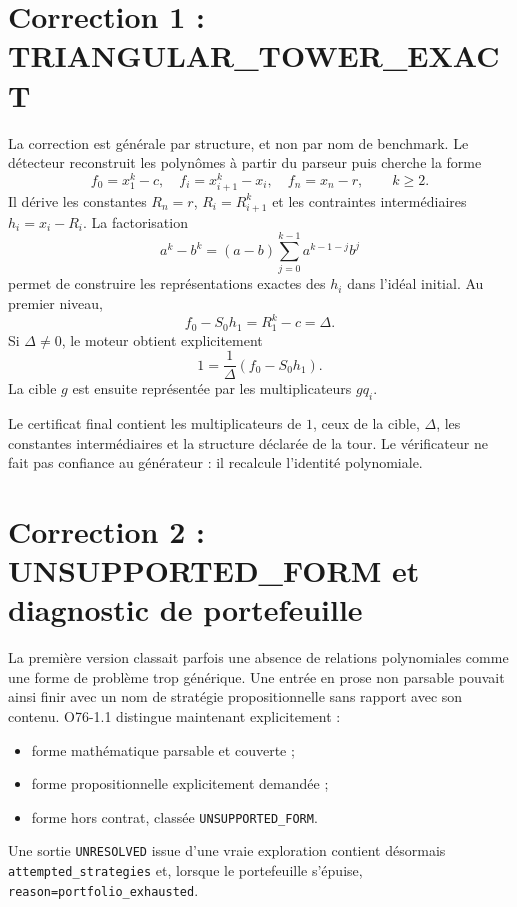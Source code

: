 \documentclass[11pt,a4paper]{article}
\newcommand{\Unresolved}{\texttt{UNRESOLVED}}
\begin{document}
\section{Correction 1 : TRIANGULAR\_TOWER\_EXACT}
La correction est générale par structure, et non par nom de benchmark. Le détecteur reconstruit les polynômes à partir du parseur puis cherche la forme
\[
f_0=x_1^k-c,\quad f_i=x_{i+1}^k-x_i,\quad f_n=x_n-r,
\qquad k\ge2.
\]
Il dérive les constantes $R_n=r$, $R_i=R_{i+1}^k$ et les contraintes intermédiaires $h_i=x_i-R_i$. La factorisation
\[
a^k-b^k=(a-b)\sum_{j=0}^{k-1}a^{k-1-j}b^j
\]
permet de construire les représentations exactes des $h_i$ dans l'idéal initial. Au premier niveau,
\[
f_0-S_0h_1=R_1^k-c=\Delta.
\]
Si $\Delta\ne0$, le moteur obtient explicitement
\[
1=\frac{1}{\Delta}(f_0-S_0h_1).
\]
La cible $g$ est ensuite représentée par les multiplicateurs $gq_i$.

Le certificat final contient les multiplicateurs de $1$, ceux de la cible, $\Delta$, les constantes intermédiaires et la structure déclarée de la tour. Le vérificateur ne fait pas confiance au générateur : il recalcule l'identité polynomiale.

\section{Correction 2 : UNSUPPORTED\_FORM et diagnostic de portefeuille}
La première version classait parfois une absence de relations polynomiales comme une forme de problème trop générique. Une entrée en prose non parsable pouvait ainsi finir avec un nom de stratégie propositionnelle sans rapport avec son contenu. O76-1.1 distingue maintenant explicitement :
\begin{itemize}
\item forme mathématique parsable et couverte ;
\item forme propositionnelle explicitement demandée ;
\item forme hors contrat, classée \texttt{UNSUPPORTED\_FORM}.
\end{itemize}
Une sortie \Unresolved{} issue d'une vraie exploration contient désormais \texttt{attempted\_strategies} et, lorsque le portefeuille s'épuise, \texttt{reason=portfolio\_exhausted}.
\end{document}
